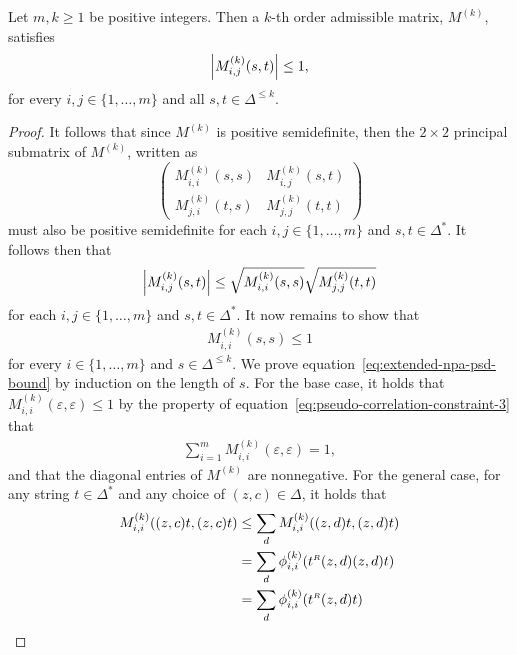 \begin{lemma} \label{lem:enpa-bounded-entries}
	Let $m,k \geq 1$ be positive integers. Then a $k$-th order admissible matrix, $M^{(k)}$, satisfies 
	\begin{align}
		\left\lvert M_{i,j}^{(k)}(s,t) \right\rvert \leq 1,
	\end{align}
for every $i,j \in \{1, \ldots, m\}$ and all $s,t \in \Delta^{\leq k}$. 
\end{lemma}

\begin{proof}
	It follows that since $M^{(k)}$ is positive semidefinite, then the $2 \times 2$ principal submatrix of $M^{(k)}$, written as 
  \begin{equation}
    \begin{pmatrix}
      M_{i,i}^{(k)}(s,s) & M_{i,j}^{(k)}(s,t) \\[2mm]
      M_{j,i}^{(k)}(t,s) & M_{j,j}^{(k)}(t,t)
    \end{pmatrix}
  \end{equation}
must also be positive semidefinite for each $i,j \in \{1,\ldots,m\}$ and $s,t \in \Delta^{\ast}$. It follows then that 
\begin{align}
	\left\lvert M_{i,j}^{(k)}(s,t) \right\rvert \leq \sqrt{M_{i,i}^{(k)}(s,s)} \sqrt{M_{j,j}^{(k)}(t,t)}
\end{align}
for each $i,j \in \{1, \ldots, m\}$ and $s,t \in \Delta^{\ast}$. It now remains to show that
	\begin{align} \label{eq:extended-npa-psd-bound}
		M_{i,i}^{(k)}(s,s) \leq 1	
	\end{align}	 
	for every $i \in \{1,\ldots,m\}$ and $s \in \Delta^{\leq k}$. We prove equation~\eqref{eq:extended-npa-psd-bound} by induction on the length of $s$. For the base case, it holds that $M_{i,i}^{(k)}(\varepsilon,\varepsilon) \leq 1$ by the property of equation~\eqref{eq:pseudo-correlation-constraint-3} that 
	\begin{align}
		\sum_{i=1}^m M_{i,i}^{(k)}(\varepsilon,\varepsilon) = 1,
	\end{align}
and that the diagonal entries of $M^{(k)}$ are nonnegative. For the general case, for any string $t \in \Delta^{\ast}$ and any choice of $(z,c) \in \Delta$, it holds that 
	\begin{align}
		M_{i,i}^{(k)}((z,c)t,(z,c)t) &\leq \sum_d M_{i,i}^{(k)}((z,d)t,(z,d)t) \\
		&= \sum_d \phi_{i,i}^{(k)}(t^\mathsmaller{R}(z,d)(z,d)t) \label{eq:enpa-psd-2} \\
		&= \sum_d \phi_{i,i}^{(k)}(t^\mathsmaller{R}(z,d)t) \label{eq:enpa-psd-3} \\

\end{align}
\end{proof}
